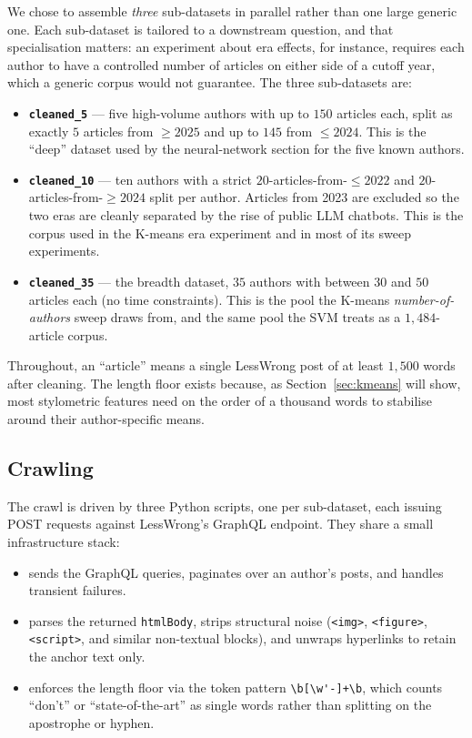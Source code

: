 \documentclass[11pt]{article}
\newcommand{\code}[1]{%
  \tcbox[on line, colback=codebg, colframe=codebg,
         boxrule=0pt, arc=2pt, left=2pt, right=2pt, top=0pt, bottom=0pt]
        {\ttfamily\small #1}}
\begin{document}
We chose to assemble \emph{three} sub-datasets in parallel rather than one large
generic one. Each sub-dataset is tailored to a downstream question, and that
specialisation matters: an experiment about era effects, for instance, requires
each author to have a controlled number of articles on either side of a cutoff
year, which a generic corpus would not guarantee. The three sub-datasets are:

\begin{itemize}\setlength\itemsep{3pt}
  \item \textbf{\texttt{cleaned\_5}} --- five high-volume authors with up to
        $150$ articles each, split as exactly $5$ articles from
        $\geq 2025$ and up to $145$ from $\leq 2024$. This is the
        ``deep'' dataset used by the neural-network section for the five
        known authors.
  \item \textbf{\texttt{cleaned\_10}} --- ten authors with a strict
        $20$-articles-from-$\leq 2022$ and $20$-articles-from-$\geq 2024$
        split per author. Articles from 2023 are excluded so the two eras are
        cleanly separated by the rise of public LLM chatbots. This is the
        corpus used in the K-means era experiment and in most of its sweep
        experiments.
  \item \textbf{\texttt{cleaned\_35}} --- the breadth dataset, $35$ authors
        with between $30$ and $50$ articles each (no time constraints). This is
        the pool the K-means \emph{number-of-authors} sweep draws from, and the
        same pool the SVM treats as a $1{,}484$-article corpus.
\end{itemize}

Throughout, an ``article'' means a single LessWrong post of at least $1{,}500$
words after cleaning. The length floor exists because, as Section~\ref{sec:kmeans}
will show, most stylometric features need on the order of a thousand words to
stabilise around their author-specific means.

\subsection{Crawling}

The crawl is driven by three Python scripts, one per sub-dataset, each issuing
POST requests against LessWrong's GraphQL endpoint. They share a small
infrastructure stack:

\begin{itemize}\setlength\itemsep{1pt}
  \item \code{requests} sends the GraphQL queries, paginates over an author's
        posts, and handles transient failures.
  \item \code{BeautifulSoup} parses the returned \texttt{htmlBody}, strips
        structural noise (\texttt{<img>}, \texttt{<figure>}, \texttt{<script>},
        and similar non-textual blocks), and unwraps hyperlinks to retain the
        anchor text only.
  \item \code{re} enforces the length floor via the token pattern
        \verb|\b[\w'-]+\b|, which counts ``don't'' or ``state-of-the-art'' as
        single words rather than splitting on the apostrophe or hyphen.
\end{itemize}
\end{document}
